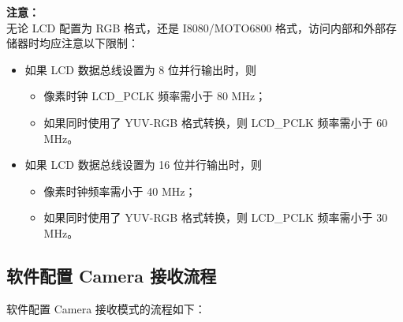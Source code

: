 \documentclass[main\_\_CN.tex]{subfiles}
\begin{document}
\textbf{注意：}\\
无论 LCD 配置为 RGB 格式，还是 I8080/MOTO6800 格式，访问内部和外部存储器时均应注意以下限制：

\begin{itemize}
    \item 如果 LCD 数据总线设置为 8 位并行输出时，则
    \begin{itemize}
        \item 像素时钟 LCD\_PCLK 频率需小于 80 MHz；
        \item 如果同时使用了 YUV-RGB 格式转换，则 LCD\_PCLK 频率需小于 60 MHz。
    \end{itemize}
    \item 如果 LCD 数据总线设置为 16 位并行输出时，则
    \begin{itemize}
        \item 像素时钟频率需小于 40 MHz；
        \item 如果同时使用了 YUV-RGB 格式转换，则 LCD\_PCLK 频率需小于 30 MHz。
    \end{itemize}
\end{itemize}

\subsection{软件配置 Camera 接收流程}
软件配置 Camera 接收模式的流程如下：
\end{document}
